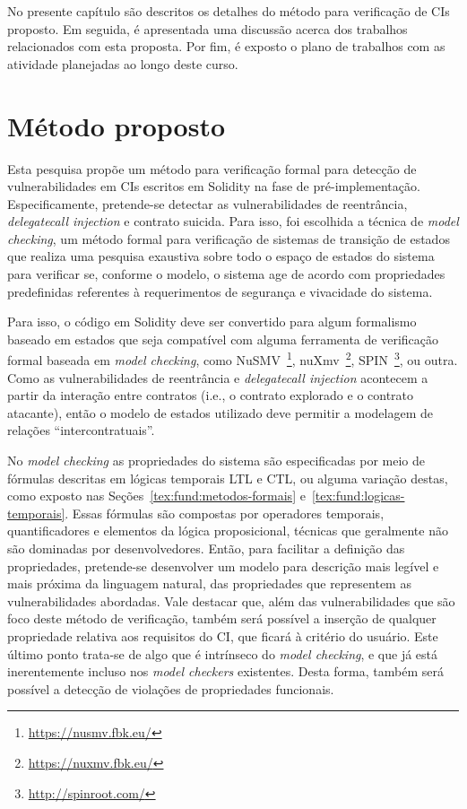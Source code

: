 No presente capítulo são descritos os detalhes do método para verificação de CIs proposto. Em seguida, é apresentada uma discussão acerca dos trabalhos relacionados com esta proposta. Por fim, é exposto o plano de trabalhos com as atividade planejadas ao longo deste curso.

\section{Método proposto}

Esta pesquisa propõe um método para verificação formal para detecção de vulnerabilidades em CIs escritos em Solidity na fase de pré-implementação. Especificamente, pretende-se detectar as vulnerabilidades de reentrância, \textit{delegatecall injection} e contrato suicida. Para isso, foi escolhida a técnica de \textit{model checking}, um método formal para verificação de sistemas de transição de estados que realiza uma pesquisa exaustiva sobre todo o espaço de estados do sistema para verificar se, conforme o modelo, o sistema age de acordo com propriedades predefinidas referentes à requerimentos de segurança e vivacidade do sistema.

Para isso, o código em Solidity deve ser convertido para algum formalismo baseado em estados que seja compatível com alguma ferramenta de verificação formal baseada em \textit{model checking}, como NuSMV~\footnote{\url{https://nusmv.fbk.eu/}}, nuXmv~\footnote{\url{https://nuxmv.fbk.eu/}}, SPIN~\footnote{\url{http://spinroot.com/}}, ou outra. Como as vulnerabilidades de reentrância e \textit{delegatecall injection} acontecem a partir da interação entre contratos (i.e., o contrato explorado e o contrato atacante), então o modelo de estados utilizado deve permitir a modelagem de relações ``intercontratuais''.


No \textit{model checking} as propriedades do sistema são especificadas por meio de fórmulas descritas em lógicas temporais LTL e CTL, ou alguma variação destas, como exposto nas Seções~\ref{tex:fund:metodos-formais} e~\ref{tex:fund:logicas-temporais}. Essas fórmulas são compostas por operadores temporais, quantificadores e elementos da lógica proposicional, técnicas que geralmente não são dominadas por desenvolvedores. Então, para facilitar a definição das propriedades, pretende-se desenvolver um modelo para descrição mais legível e mais próxima da linguagem natural, das propriedades que representem as vulnerabilidades abordadas. Vale destacar que, além das vulnerabilidades que são foco deste método de verificação, também será possível a inserção de qualquer propriedade relativa aos requisitos do CI, que ficará à critério do usuário. Este último ponto trata-se de algo que é intrínseco do \textit{model checking}, e que já está inerentemente incluso nos \textit{model checkers} existentes. Desta forma, também será possível a detecção de violações de propriedades funcionais.

